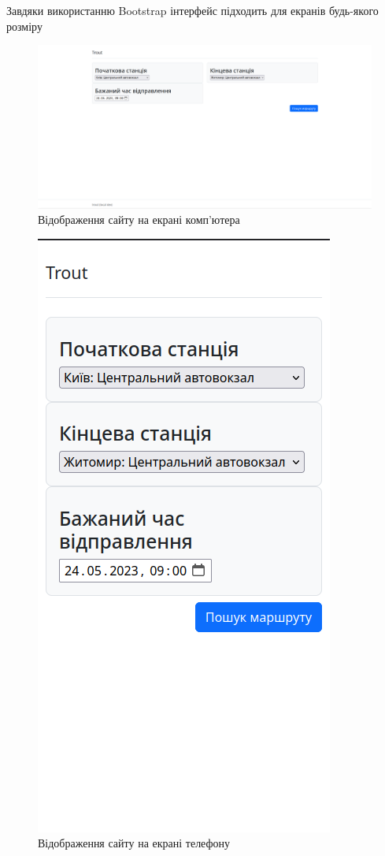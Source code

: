 Завдяки використанню Bootstrap інтерфейс підходить для екранів будь-якого розміру

\begin{figure}[!htp]
	\centering
	\includegraphics[scale=0.4]{content/chapters/4-results/assets/img/pc_screen.png}
	\caption{Відображення сайту на екрані комп'ютера}
	\label{fig:pc_page}
\end{figure}

\begin{figure}[!htp]
	\centering
	\includegraphics[scale=0.5]{content/chapters/4-results/assets/img/phone_screen.png}
	\caption{Відображення сайту на екрані телефону}
	\label{fig:phone_page}
\end{figure}
